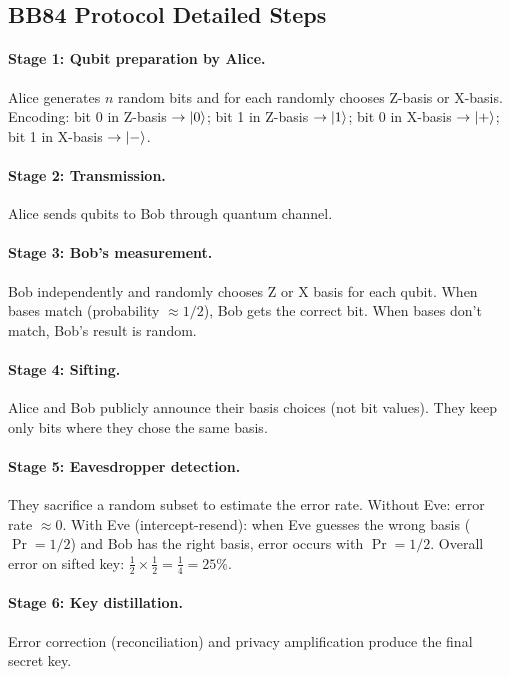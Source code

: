 \documentclass[10pt,a4paper]{article}
\begin{document}
\subsection{BB84 Protocol Detailed Steps}

\paragraph{Stage 1: Qubit preparation by Alice.}
Alice generates $n$ random bits and for each randomly chooses Z-basis or X-basis. Encoding: bit 0 in Z-basis $\to\ket{0}$; bit 1 in Z-basis $\to\ket{1}$; bit 0 in X-basis $\to\ket{+}$; bit 1 in X-basis $\to\ket{-}$.

\paragraph{Stage 2: Transmission.}
Alice sends qubits to Bob through quantum channel.

\paragraph{Stage 3: Bob's measurement.}
Bob independently and randomly chooses Z or X basis for each qubit. When bases match (probability $\approx 1/2$), Bob gets the correct bit. When bases don't match, Bob's result is random.

\paragraph{Stage 4: Sifting.}
Alice and Bob publicly announce their basis choices (not bit values). They keep only bits where they chose the same basis.

\paragraph{Stage 5: Eavesdropper detection.}
They sacrifice a random subset to estimate the error rate. Without Eve: error rate $\approx 0$. With Eve (intercept-resend): when Eve guesses the wrong basis ($\Pr=1/2$) and Bob has the right basis, error occurs with $\Pr=1/2$. Overall error on sifted key: $\frac{1}{2}\times\frac{1}{2}=\frac{1}{4}=25\%$.

\paragraph{Stage 6: Key distillation.}
Error correction (reconciliation) and privacy amplification produce the final secret key.
\end{document}
